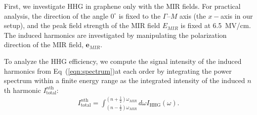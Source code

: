 First, we investigate HHG in graphene only with the MIR fields. For practical analysis, the
direction of the angle $0^\circ$ is fixed to the $\Gamma$--$M$ axis (the $x-$axis in our setup), and the peak field strength of the MIR field $E_{MIR}$ is fixed at 6.5~MV/cm. The induced harmonics are investigated by manipulating the polarization direction of the MIR field, $\mathbf e_{MIR}$.

To analyze the HHG efficiency, we compute the signal intensity of the induced harmonics from
Eq~(\ref{eqn:spectrum})at each
order by integrating the power spectrum within a finite energy range as  the integrated intensity
of the induced $n$th harmonic $I^{n \textrm{th}}_{\mathrm{total}}$:
\begin{align}
	I^{n \textrm{th}}_{\mathrm{total}} = \int_{\left (n-\frac{1}{2} \right )\omega_{MIR}}^{\left (n+\frac{1}{2} \right )\omega_{MIR}} d \omega I_{\textrm{HHG}} (\omega).
	\label{eqn:integrate_intensity}
\end{align}

